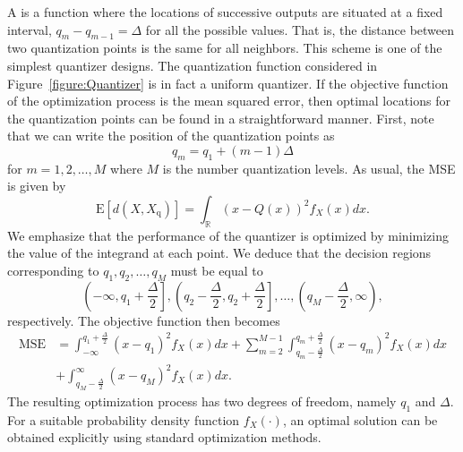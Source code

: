 A  is a function where the locations of successive outputs are situated at a fixed interval, $q_m - q_{m-1} = \Delta$ for all the possible values.
That is, the distance between two quantization points is the same for all neighbors.
This scheme is one of the simplest quantizer designs.
The quantization function considered in Figure~\ref{figure:Quantizer} is in fact a uniform quantizer.
If the objective function of the optimization process is the mean squared error, then optimal locations for the quantization points can be found in a straightforward manner.
First, note that we can write the position of the quantization points as
\begin{equation*}
q_m = q_1 + (m-1) \Delta
\end{equation*}
for $m = 1, 2, \ldots, M$ where $M$ is the number quantization levels.
As usual, the MSE is given by
\begin{equation*}
\mathrm{E} [ d(X, X_{\mathrm{q}}) ]
= \int_{\mathbb{R}} (x - Q(x))^2 f_X(x) dx .
\end{equation*}
We emphasize  that the performance of the quantizer is optimized by minimizing the value of the integrand at each point.
We deduce that the decision regions corresponding to $q_1, q_2, \ldots, q_M$ must be equal to
\begin{equation*}
\left( - \infty, q_1 + \frac{\Delta}{2} \right],
\left( q_2 - \frac{\Delta}{2}, q_2 + \frac{\Delta}{2} \right],
\ldots,
\left( q_M - \frac{\Delta}{2}, \infty \right) ,
\end{equation*}
respectively.
The objective function then becomes
\begin{equation} \label{equation:UniformQuantizerMSE}
\begin{split}
\text{MSE} &= \int_{-\infty}^{q_1 + \frac{\Delta}{2}} (x - q_1)^2 f_X(x) dx
+ \sum_{m=2}^{M-1}
\int_{q_m - \frac{\Delta}{2}}^{q_m + \frac{\Delta}{2}}
(x - q_m)^2 f_X(x) dx \\
&+ \int_{q_M - \frac{\Delta}{2}}^{\infty} (x - q_M)^2 f_X(x) dx .
\end{split}
\end{equation}
The resulting optimization process has two degrees of freedom, namely $q_1$ and $\Delta$.
For a suitable probability density function $f_X(\cdot)$, an optimal solution can be obtained explicitly using standard optimization methods.

